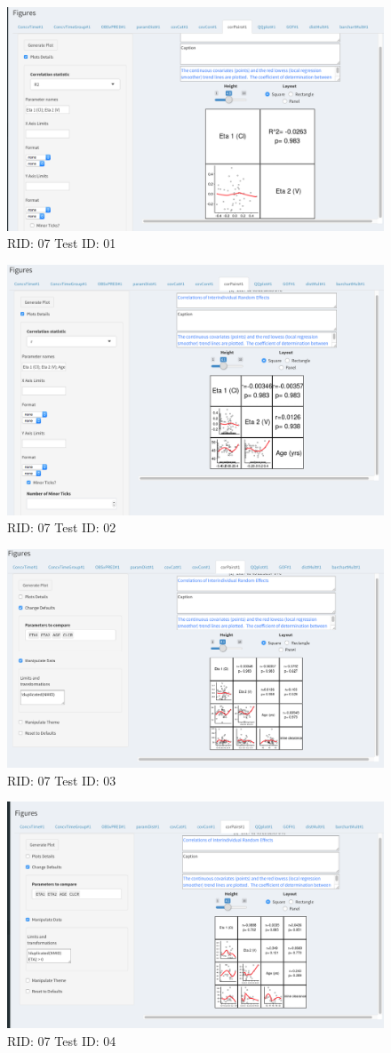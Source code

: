 \begin{figure}[H]
\includegraphics[width=.8\textwidth]{screencaps/07-01-1.png}
\caption{RID: 07 Test ID: 01}
\end{figure}
\begin{figure}[H]
\includegraphics[width=.8\textwidth]{screencaps/07-02-1.png}
\caption{RID: 07 Test ID: 02}
\end{figure}
\begin{figure}[H]
\includegraphics[width=.8\textwidth]{screencaps/07-03-1.png}
\caption{RID: 07 Test ID: 03}
\end{figure}
\begin{figure}[H]
\includegraphics[width=.8\textwidth]{screencaps/07-04-1.png}
\caption{RID: 07 Test ID: 04}
\end{figure}

